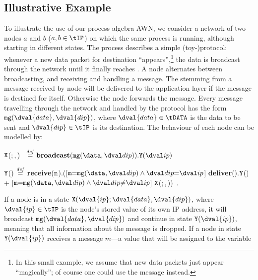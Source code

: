 \documentclass[envcountsame,envcountsect,orivec,runningheads]{llncs}
\newcommand{\awn}{AWN\xspace}
\renewcommand{\algorithmiccomment}[1]{\textcolor{blue}{\hspace{1.3em}/*#1*/}}\renewcommand{\COMLINE}[1]{\STATE\textcolor{blue}{/*#1*/}}\renewcommand{\COMspec}[1]{\textcolor{blue}{/*#1*/}}\renewcommand{\algorithmicelsif}{$+$\,\algorithmicif}
\newenvironment{simpleProcess}{\newcommand{\algindent}{0.1em}
  \renewcommand{\algorithmicelsif}{$+$\algorithmicif}
  \renewcommand{\algorithmiccomment}[1]{\textcolor{blue}{\hspace{\algindent}/*\,##1\,*/}}
  \algsetup{indent=0.7em}
\begin{algorithmic}}{
  \end{algorithmic}
  }
\renewcommand{\keyw}[1]{\ensuremath{{\tt #1}}}
\begin{document}
\subsection{Illustrative Example}
\renewcommand{\a}{a}
\renewcommand{\b}{b}
\newcommand{\mymsg}[2]{\keyw{mg}(#1,#2)}
To illustrate the use of our process algebra \awn, we consider a network
of two nodes $\a$ and $\b$ ($\a,\b\in\tIP$)
on which the same process is running, although starting in different states.
The process describes a simple (toy-)protocol: whenever a new data packet 
for destination  ``appears'',\footnote{In
this small example, we assume that new data packets just
  appear ``magically''; of course one could use the message
\newpkt{\data}{\dip} instead.}
the data is broadcast through the network until it finally reaches .
A node alternates between broadcasting, and receiving and handling a message.
The  stemming from a message received by node  will be delivered to
the application layer if the message is destined for  itself. Otherwise the node
forwards the message. 
Every message travelling through the network and handled by the protocol 
has the form $\mymsg{\dval{data}}{\dval{dip}}$, where $\dval{data}\in\tDATA$ is the data to be sent 
and $\dval{dip}\in\tIP$ is its destination.
The behaviour of each node can be modelled by:\newcommand{\XP}{\keyw{X}}\newcommand{\YP}{\keyw{Y}}\begin{simpleProcess}
	\item[\XP(\ip;\,\data,\,\dip)]\hspace{-\labelsep}\ $\stackrel{{\it def}}{=}
 	\textbf{broadcast}(\mymsg\data\dip).\YP(\ip)$
	\item[\YP(\ip)]\hspace{-\labelsep}
		$\stackrel{{\it def}}{=}$ \textbf{receive}(\keyw{m}).([$\keyw{m} \mathord= \mymsg\data\dip\wedge\dip\mathord=\ip$] \textbf{deliver}(\data).\YP(\ip)\\ 
		\hspace{7.25em}
		+ [$\keyw{m} \mathord= \mymsg\data\dip\wedge\dip\mathord{\not=}\ip$] \XP(\ip;\,\data,\,\dip))\ .
\end{simpleProcess}\vspace{2pt}
If a node is in a state $\XP(\dval{ip};\dval{data},\dval{dip})$, where $\dval{ip}\in\tIP$
is the node's stored value of its own IP address,
it will broadcast $\mymsg{\dval{data}}{\dval{dip}}$ and continue in state $\YP(\dval{ip})$, 
meaning that all information about the message is dropped.
If a node in state $\YP(\dval{ip})$ receives a message $m$---a value that will be assigned to the variable
\end{document}
